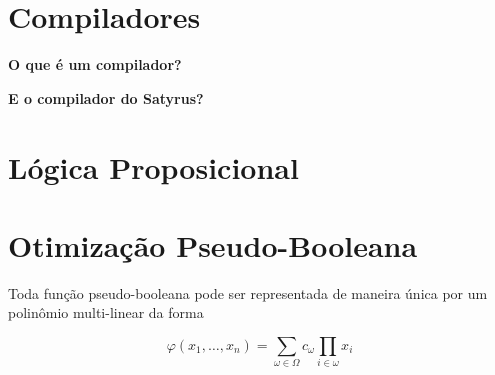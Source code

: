 
\section{Compiladores}

\textbf{O que é um compilador?}


\textbf{E o compilador do Satyrus?}


\section{Lógica Proposicional}


\section{Otimização Pseudo-Booleana}

Toda função pseudo-booleana pode ser representada de maneira única por um polinômio multi-linear da forma\cite{boros:2002}

$$ \varphi (x_1, \dots, x_n) = \sum_{\omega \in \Omega} c_{\omega} \prod_{i \in \omega} x_{i}$$

